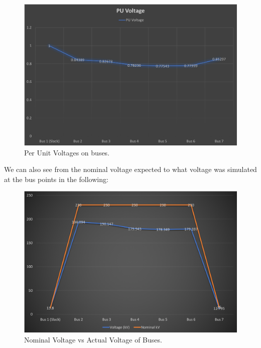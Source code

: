 \documentclass[12pt]{article}
\begin{document}
		\begin{figure}[H]
			\centerline{\includegraphics[scale=0.6]{images/perunit}}
			\caption{Per Unit Voltages on buses.}
		\end{figure}
	
	\indent\par{We can also see from the nominal voltage expected to what voltage was simulated at the bus points in the following:}
	\begin{figure}[H]
		\centerline{\includegraphics[scale=0.6]{images/nomvsact}}
		\caption{Nominal Voltage vs Actual Voltage of Buses.}
	\end{figure}
		

    
\end{document}
